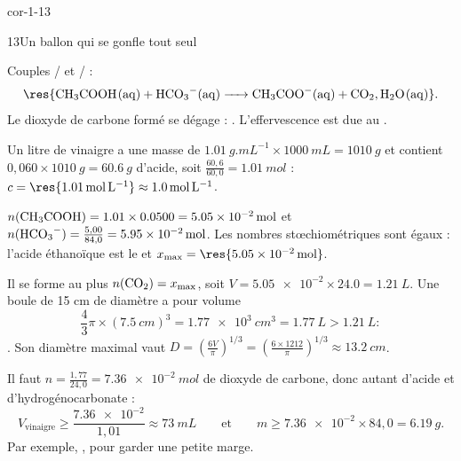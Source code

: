 \begin{blocLivre}{cor-1-13}
\begin{corrige}{13}{Un ballon qui se gonfle tout seul}
\begin{questions}
\item Couples / et / :
\[\res{\ce{CH3COOH(aq) + HCO3^-(aq) -> CH3COO^-(aq) + CO2,H2O(aq)}}.\]
Le dioxyde de carbone formé se dégage : . L'effervescence est due au .
\item Un litre de vinaigre a une masse de $\qty{1,01}{g.mL^{-1}}\times\qty{1000}{mL}=\qty{1010}{g}$ et contient
$0{,}060\times\qty{1010}{g}=\qty{60,6}{g}$ d'acide, soit $\frac{60{,}6}{60{,}0}=\qty{1,01}{mol}$ :
$c=\res{\qty{1,01}{mol.L^{-1}}}\approx\qty{1,0}{mol.L^{-1}}$.
\item $n(\ce{CH3COOH})=\num{1.01}\times\num{0.0500}=\qty{5,05e-2}{mol}$ et
$n(\ce{HCO3-})=\frac{5{,}00}{84{,}0}=\qty{5,95e-2}{mol}$. Les nombres stœchiométriques sont égaux :
l'acide éthanoïque est le  et $x_\mathrm{max}=\res{\qty{5,05e-2}{mol}}$.
\item Il se forme au plus $n(\ce{CO2})=x_\mathrm{max}$, soit $V=\num{5.05e-2}\times\num{24.0}=\qty{1,21}{L}$.
Une boule de 15 cm de diamètre a pour volume
\[\frac43\pi\times(\qty{7,5}{cm})^3=\qty{1,77e3}{cm^3}=\qty{1,77}{L}>\qty{1,21}{L}:\]
. Son diamètre maximal vaut
$D=\left(\frac{6V}{\pi}\right)^{1/3}=\left(\frac{6\times\num{1212}}{\pi}\right)^{1/3}\approx\qty{13,2}{cm}$.
\item Il faut $n=\frac{1{,}77}{24{,}0}=\qty{7,36e-2}{mol}$ de dioxyde de carbone, donc autant d'acide et
d'hydrogénocarbonate :
\[V_\text{vinaigre}\geq\frac{\num{7.36e-2}}{1{,}01}\approx\qty{73}{mL}\qquad\text{et}\qquad
m\geq\num{7.36e-2}\times84{,}0=\qty{6,19}{g}.\]
Par exemple, , pour garder une petite marge.
\end{questions}
\end{corrige}
\end{blocLivre}
